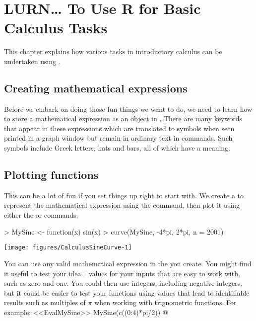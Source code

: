 

 
\chapter{LURN\ldots{} To Use R for Basic Calculus Tasks} 
\label{Calculus} 
 

 
This chapter explains how various tasks in introductory calculus can be undertaken using \R{}. 
 
 
\section{Creating mathematical expressions} 
 
Before we embark on doing those fun things we want to do, we need to learn how to store a mathematical expression as an object in \R{}. There are many keywords that appear in these expressions which are translated to symbols when seen printed in a graph window but remain in ordinary text in \R{} commands. Such symbols include Greek letters, hats and bars, all of which have a meaning. 
 
\section{Plotting functions} 
 
This can be a lot of fun if you set things up right to start with. We create a  to represent the mathematical expression using the  command, then plot it using either the  or  commands. 
\begin{Schunk}
\begin{Sinput}
> MySine <- function(x){ sin(x)} 
> curve(MySine, -4*pi, 2*pi, n = 2001) 
\end{Sinput}

\texttt{[image: figures/CalculusSineCurve-1]} \end{Schunk}
 
You can use any valid mathematical expression in the  you create. You might find it useful to test your idea= values for your inputs that are easy to work with, such as zero and one. You could then use integers, including negative integers, but  it could be easier to test your functions using values that lead to identifiable results such as multiples of $\pi$ when working with trignometric functions. For example: 
<<EvalMySine>> 
MySine(c((0:4)*pi/2)) 
@ 
 
